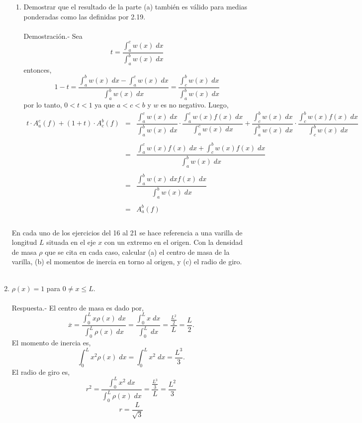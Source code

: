 \begin{enumerate}[\bfseries 1.]
\begin{enumerate}[\bfseries (a)]
	\item Demostrar que el resultado de la parte (a) también es válido para medias ponderadas como las definidas por 2.19.\\\\
	    Demostración.-\; Sea 
	    $$t=\dfrac{\int_a^c w(x)\; dx}{\int_a^b w(x)\; dx}$$
	    entonces,
	    $$1-t=\dfrac{\int_a^b w(x)\; dx - \int_a^c w(x)\; dx}{\int_a^b w(x)\; dx}=\dfrac{\int_c^b w(x)\; dx}{\int_a^b w(x)\; dx}$$
	    por lo tanto, $0<t<1$ ya que $a<c<b$ y $w$ es no negativo. Luego,
	    $$\begin{array}{rcl}
		t\cdot A_a^c (f) + (1+t)\cdot A_c^b(f)&=&\dfrac{\int_a^c w(x)\;dx}{\int_a^b w(x)\; dx}\cdot \dfrac{\int_a^c w(x)f(x)\; dx}{\int_a^c w(x)\; dx}+\dfrac{\int_c^b w(x)\; dx}{\int_a^b w(x)\; dx}\cdot \dfrac{\int_c^b w(x)f(x)\; dx}{\int_c^b w(x)\; dx}\\\\
						      &=&\dfrac{\int_a^c w(x)f(x)\; dx + \int_c^b w(x)f(x)\; dx}{\int_a^b w(x)\; dx}\\\\
		&=&\dfrac{\int_a^b w(x)\; dx f(x)\;dx}{\int_a^b w(x)\; dx}\\\\
		&=&A_a^b (f)\\\\
	    \end{array}$$
	    
    \end{enumerate}

En cada uno de los ejercicios del 16 al 21 se hace referencia a una varilla de longitud $L$ situada en el eje $x$ con un extremo en el origen. Con la densidad de masa $\rho$ que se cita en cada caso, calcular (a) el centro de masa de la varilla, (b) el momentos de inercia en torno al origen, y (c) el radio de giro.\\\\

\item $\rho(x)=1$ para $0\neq x \leq L$.\\\\
    Respuesta.-\; El centro de masa es dado por, 
    $$\overline{x} = \dfrac{\int_0^L x\rho(x)\; dx}{\int_0^L \rho(x)\; dx} = \dfrac{\int_0^L x \; dx}{\int_0^L \; dx} = \dfrac{\frac{L^2}{2}}{L} = \dfrac{L}{2}.$$
    El momento de inercia es,
    $$\int_0^L x^2 \rho(x)\; dx = \int_0^L x^2\; dx = \dfrac{L^3}{3}.$$
    El radio de giro es,
    $$r^2 = \dfrac{\int_0^L x^2\; dx}{\int_0^L \rho(x)\; dx} = \dfrac{\frac{L^3}{3}}{L} = \dfrac{L^2}{3}$$
    $$r=\dfrac{L}{\sqrt{3}}$$


\end{enumerate}
